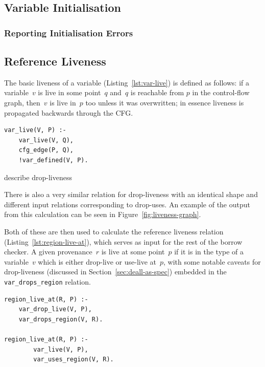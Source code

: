 \documentclass[11pt,a4paper,twoside,openany]{report}
\newcommand{\fixme}[1] {{\color{red}#1}}
\newenvironment{sourcecode}{\captionsetup{type=listing}}{}
\newcommand{\InDatalog}[1]{\texttt{#1}}
\begin{document}
\subsection{Variable Initialisation}
\label{sec:var-initalisation}

\subsubsection{Reporting Initialisation Errors}
\label{sec:initialisation:errors}

\subsection{Reference Liveness}
\label{sec:var-livenes}

The basic liveness of a variable (Listing~\ref{lst:var-live}) is defined as
follows: if a variable~$v$ is live in some point~$q$ and~$q$ is reachable from
$p$ in the control-flow graph, then~$v$ is live in~$p$ too unless it was
overwritten; in essence liveness is propagated backwards through the CFG.

\begin{sourcecode}
  \label{lst:var-live}
\begin{verbatim}
var_live(V, P) :-
    var_live(V, Q),
    cfg_edge(P, Q),
    !var_defined(V, P).
\end{verbatim}
\end{sourcecode}

\fixme{describe drop-liveness}

There is also a very similar relation for drop-liveness with an identical shape
and different input relations corresponding to drop-uses. An example of the
output from this calculation can be seen in Figure~\ref{fig:liveness-graph}.

Both of these are then used to calculate the reference liveness relation
(Listing~\ref{lst:region-live-at}), which serves as input for the rest of the
borrow checker. A given provenance~$r$ is live at some point~$p$ if it is in the
type of a variable~$v$ which is either drop-live or use-live at~$p$, with some
notable caveats for drop-liveness (discussed in Section~\ref{sec:deall-as-spec})
embedded in the \InDatalog{var_drops_region} relation.

\begin{sourcecode}
  \label{lst:region-live-at}
\begin{verbatim}
region_live_at(R, P) :-
    var_drop_live(V, P),
    var_drops_region(V, R).
        
region_live_at(R, P) :-
        var_live(V, P),
        var_uses_region(V, R).
\end{verbatim}
\end{sourcecode}
\end{document}
